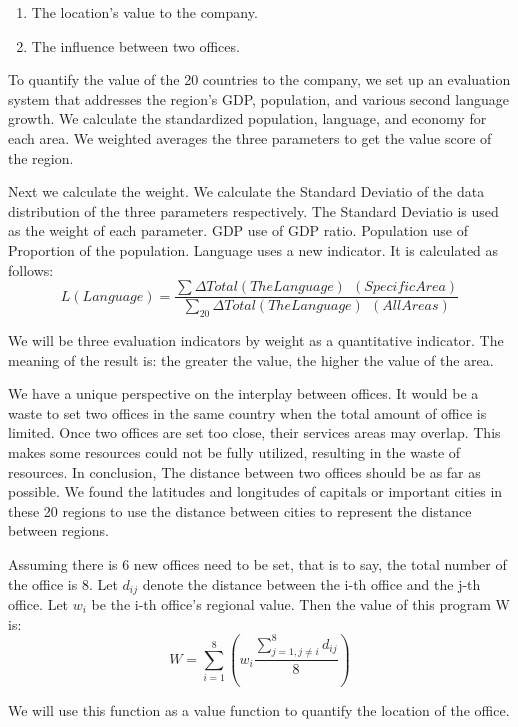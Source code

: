 \documentclass{mcmthesis}
\begin{document}
    \begin{enumerate}
      \item The location's value to the company.
      \item The influence between two offices.
    \end{enumerate}

    To quantify the value of the 20 countries to the company,
    we set up an evaluation system that addresses the region's GDP, population, and various second language growth.
    We calculate the standardized population, language, and economy for each area.
    We weighted averages the three parameters to get the value score of the region.

    Next we calculate the weight.
    We calculate the Standard Deviatio of the data distribution of the three parameters respectively.
    The Standard Deviatio is used as the weight of each parameter.
    GDP use of GDP ratio.
    Population use of Proportion of the population.
    Language uses a new indicator.
    It is calculated as follows:
    $$L(Language)=\frac{\sum \Delta Total(The Language)\ \  (Specific Area)}{\sum_{20} \Delta Total(The Language)\ \  (All Areas)}$$

    We will be three evaluation indicators by weight as a quantitative indicator.
    The meaning of the result is: the greater the value, the higher the value of the area.

    We have a unique perspective on the interplay between offices.
    It would be a waste to set two offices in the same country when the total amount of office is limited.
    Once two offices are set too close, their services areas may overlap.
    This makes some resources could not be fully utilized, resulting in the waste of resources.
    In conclusion, The distance between two offices should be as far as possible.
    We found the latitudes and longitudes of capitals or important cities
    in these 20 regions to use the distance between cities to represent the distance between regions.

    Assuming there is 6 new offices need to be set, that is to say, the total number of the office is 8.
    Let $d_{ij}$ denote the distance between the i-th office and the j-th office.
    Let $w_i$ be the i-th office's regional value.
    Then the value of this program W is:
    $$W=\sum_{i=1}^8(w_i\frac{\sum_{j=1,j\neq i}^8 d_{ij}}{8})$$

    We will use this function as a value function to quantify the location of the office.
\end{document}
